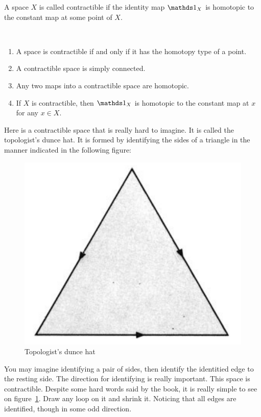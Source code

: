 \begin{defi}[Contractible]
    A space $X$ is called contractible if the identity map $\id_X$ is
    homotopic to the constant map at some point of $X$.
\end{defi}
\begin{thm}$ $

    \begin{enumerate}
        \item A space is contractible if and only if it has the
            homotopy type of a point.
        \item A contractible space is simply connected.
        \item Any two maps into a contractible space are homotopic.
        \item If $X$ is contractible, then $\id_X$ is homotopic to the
            constant map at $x$ for any $x\in X$.
    \end{enumerate}
\end{thm}
\begin{ex}
    Here is a contractible space that is really hard to imagine. It is
    called the topologist's dunce hat. It is formed by identifying the
    sides of a triangle in the manner indicated in the following
    figure:
    \begin{figure}[H]
        \centering
        \includegraphics[width=0.4\linewidth]{pics/topo-dunce-hat.PNG}
        \caption{Topologist's dunce hat}
        \label{fig:topo-d-hat}
    \end{figure}
    You may imagine identifying a pair of sides, then identify the
    identitied edge to the resting side. The direction for identifying
    is really important.
    This space is contractible. Despite some hard words said by the
    book, it is really simple to see on figure~\ref{fig:topo-d-hat}.
    Draw any loop on it and shrink it. Noticing that all edges are
    identified, though in some odd direction.
\end{ex}

